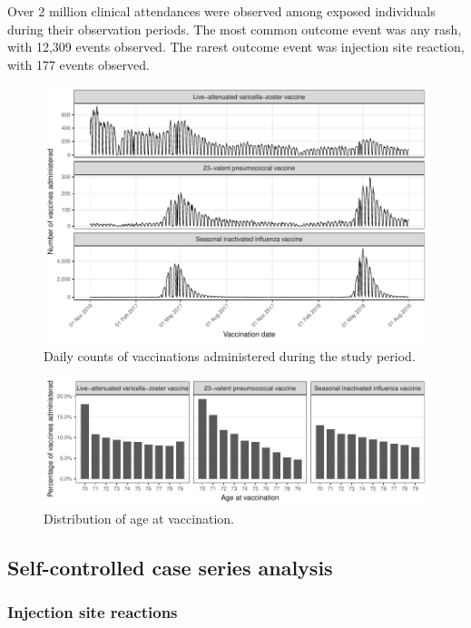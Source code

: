 \documentclass[review, endfloat]{elsarticle}
\begin{document}
Over 2 million clinical attendances were observed among exposed individuals during their observation periods. The most common outcome event was any rash, with 12,309 events observed. The rarest outcome event was injection site reaction, with 177 events observed.

\begin{figure}
\includegraphics{figs/exposure_time_series}
\caption{Daily counts of vaccinations administered during the study period.}
\label{fig:vax_dates}
\end{figure}

\begin{figure}
\includegraphics{figs/age_at_exposure}
\caption{Distribution of age at vaccination.}
\label{fig:vax_ages}
\end{figure}


\subsection{Self-controlled case series analysis}





\subsubsection{Injection site reactions}
\end{document}

